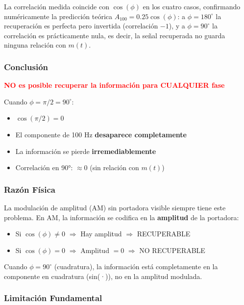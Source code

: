 \documentclass[12pt]{article}
\begin{document}
La correlación medida coincide con $\cos(\phi)$ en los cuatro casos, confirmando numéricamente la predicción teórica $A_{100} = 0.25\cos(\phi)$: a $\phi=180^\circ$ la recuperación es perfecta pero invertida (correlación $-1$), y a $\phi=90^\circ$ la correlación es prácticamente nula, es decir, la señal recuperada no guarda ninguna relación con $m(t)$.

\subsubsection*{Conclusión}

\begin{center}
\textcolor{red}{\textbf{NO es posible recuperar la información para CUALQUIER fase}}
\end{center}

Cuando $\phi = \pi/2 = 90^\circ$:
\begin{itemize}
\item $\cos(\pi/2) = 0$
\item El componente de 100 Hz \textbf{desaparece completamente}
\item La información se pierde \textbf{irremediablemente}
\item Correlación en 90°: $\approx 0$ (sin relación con $m(t)$)
\end{itemize}

\subsubsection*{Razón Física}

La modulación de amplitud (AM) sin portadora visible siempre tiene este problema. En AM, la información se codifica en la \textbf{amplitud} de la portadora:

\begin{itemize}
\item Si $\cos(\phi) \neq 0$ $\Rightarrow$ Hay amplitud $\Rightarrow$ RECUPERABLE
\item Si $\cos(\phi) = 0$ $\Rightarrow$ Amplitud $= 0$ $\Rightarrow$ NO RECUPERABLE
\end{itemize}

Cuando $\phi = 90^\circ$ (cuadratura), la información está completamente en la componente en cuadratura (sin(·)), no en la amplitud modulada.

\subsubsection*{Limitación Fundamental}
\end{document}
